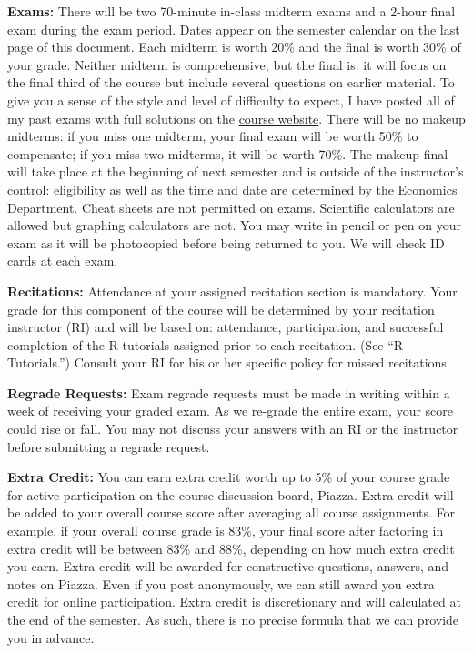 \documentclass[11pt, letterpaper]{article}
\begin{document}
\medskip

\noindent \textbf{Exams:} 
There will be two 70-minute in-class midterm exams and a 2-hour final exam during the exam period.
Dates appear on the semester calendar on the last page of this document. 
Each midterm is worth 20\% and the final is worth 30\% of your grade.
Neither midterm is comprehensive, but the final is: it will focus on the final third of the course but include several questions on earlier material.
To give you a sense of the style and level of difficulty to expect, I have posted all of my past exams with full solutions on the \href{http://ditraglia.com/Econ103Public}{course website}.
There will be no makeup midterms: if you miss one midterm, your final exam will be worth 50\% to compensate; if you miss two midterms, it will be worth 70\%.
The makeup final will take place at the beginning of next semester and is outside of the instructor's control: eligibility as well as the time and date are determined by the Economics Department. 
Cheat sheets are not permitted on exams.
Scientific calculators are allowed but graphing calculators are not. 
You may write in pencil or pen on your exam as it will be photocopied before being returned to you.
We will check ID cards at each exam.

\medskip
 
\noindent \textbf{Recitations:} Attendance at your assigned recitation section is mandatory. Your grade for this component of the course will be determined by your recitation instructor (RI) and will be based on: attendance, participation, and successful completion of the R tutorials assigned prior to each recitation. (See ``R Tutorials.'') Consult your RI for his or her specific policy for missed recitations.

\medskip

\noindent \textbf{Regrade Requests:}
Exam regrade requests must be made in writing within a week of receiving your graded exam. 
As we re-grade the entire exam, your score could rise or fall. 
You may not discuss your answers with an RI or the instructor before submitting a regrade request. 


\medskip

\noindent \textbf{Extra Credit:} 
You can earn extra credit worth up to 5\% of your course grade for active participation on the course discussion board, Piazza.
Extra credit will be added to your overall course score after averaging all course assignments.
For example, if your overall course grade is 83\%, your final score after factoring in extra credit will be between 83\% and 88\%, depending on how much extra credit you earn. 
Extra credit will be awarded for constructive questions, answers, and notes on Piazza.
Even if you post anonymously, we can still award you extra credit for online participation.
Extra credit is discretionary and will calculated at the end of the semester.
As such, there is no precise formula that we can provide you in advance.
\end{document}
